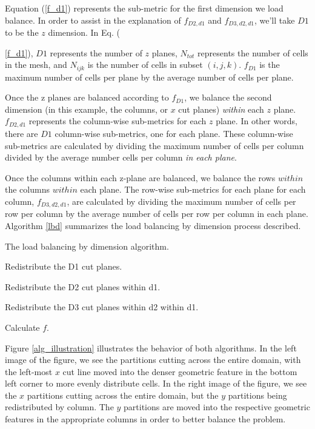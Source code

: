 Equation (\ref{f_d1}) represents the sub-metric for the first dimension we load balance. In order to assist in the explanation of $f_{D2,d1}$ and $f_{D3,d2,d1}$, we'll take $D1$ to be the $z$ dimension. In Eq. ({\ref{f_d1}), $D1$ represents the number of $z$ planes, $N_{tot}$ represents the number of cells in the mesh, and $N_{ijk}$ is the number of cells in subset $(i,j,k)$. $f_{D1}$ is the maximum number of cells per plane by the average number of cells per plane. 

Once the z planes are balanced according to $f_{D1}$, we balance the second dimension (in this example, the columns, or $x$ cut planes) \textit{within} each $z$ plane. $f_{D2,d1}$ represents the column-wise sub-metrics for each $z$ plane. In other words, there are $D1$ column-wise sub-metrics, one for each plane. These column-wise sub-metrics are calculated by dividing the maximum number of cells per column divided by the average number cells per column \textit{in each plane}. 

Once the columns within each z-plane are balanced, we balance the rows $within$ the columns $within$ each plane. The row-wise sub-metrics for each plane for each column, $f_{D3,d2,d1}$, are calculated by dividing the maximum number of cells per row per column by the average number of cells per row per column in each plane. Algorithm \ref{lbd} summarizes the load balancing by dimension process described. 

\begin{algorithm}[H]
\caption{The load balancing by dimension algorithm.}
\label{lbd}
\begin{algorithmic}

    \STATE Redistribute the D1 cut planes.
  \ENDWHILE  
  
      \STATE Redistribute the D2 cut planes within d1. 
    \ENDWHILE
  \ENDFOR
  
        \STATE Redistribute the D3 cut planes within d2 within d1. 
      \ENDWHILE
    \ENDFOR
  \ENDFOR
  
  \STATE Calculate $f$.
\end{algorithmic}
\end{algorithm}

Figure \ref{alg_illustration} illustrates the behavior of both algorithms. In the left image of the figure, we see the partitions cutting across the entire domain, with the left-most $x$ cut line moved into the denser geometric feature in the bottom left corner to more evenly distribute cells. In the right image of the figure, we see the $x$ partitions cutting across the entire domain, but the $y$ partitions being redistributed by column. The $y$ partitions are moved into the respective geometric features in the appropriate columns in order to better balance the problem.

}
